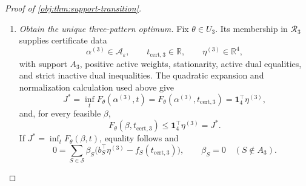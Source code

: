 \documentclass[11pt]{article}
\begin{document}
\begin{proof}[Proof of \cref{obj:thm:support-transition}]
\begin{enumerate}
For the five-pattern certificate, define
\[
I_5=I_\theta(\alpha^{(5)}),
\qquad
c=\begin{pmatrix}-1\\1\end{pmatrix},
\qquad
w_5=\frac{v(t_{\mathrm{cert},5})}{J^*(\theta,p,\varepsilon)}.
\]
The matrix \(I_5\) is positive semidefinite, since it is a sum of nonnegative multiples of \(g_Sg_S^\top\). Stationarity and the certificate value give
\[
\mathbf1_2^\top I_5v(t_{\mathrm{cert},5})=0,
\qquad
v(t_{\mathrm{cert},5})^\top I_5v(t_{\mathrm{cert},5})=J^*.
\]
The first identity makes the two coordinates of \(I_5v(t_{\mathrm{cert},5})\) opposite; the second makes its second coordinate \(J^*\). Hence
\[
I_5v(t_{\mathrm{cert},5})=J^*c,
\qquad
I_5w_5=c,
\qquad
c^\top w_5=\frac1{J^*}=V^*.
\]
Every other solution \(w_{\mathrm{alt}}\in\mathbb R^2\) of \(I_5w_{\mathrm{alt}}=c\) has the same contrast value, because
\[
c^\top(w_{\mathrm{alt}}-w_5)
=w_5^\top I_5(w_{\mathrm{alt}}-w_5)=0.
\]
The contrast-variance convention in \cref{obj:thm:five-output-region} therefore gives variance \(V^*>0\), equal to its nonnegative part.

For the associated staircase channel,
\[
(P_\theta Q_{\alpha^{(5)}})(\{S\})
=\alpha^{(5)}_S h_S(\theta).
\]
The positive masses \(h_S(\theta)\) make precisely the five patterns in \(A_5\) active, so
\[
\kappa(Q_{\alpha^{(5)}})=5.
\]
Feasibility supplies unit row sums, and the ray entries \(1,3\) supply the privacy inequalities. Finally, \cref{obj:thm:five-output-region} gives
\[
\kappa(Q)\ge5
\]
for every attaining stationary \(\varepsilon\)-LDP channel on any measurable output space, since \(\iota(\theta)\in\mathcal R_5\).

\item \emph{Obtain the unique three-pattern optimum.}
Fix \(\theta\in U_3\). Its membership in \(\mathcal R_3\) supplies certificate data
\[
\alpha^{(3)}\in\mathcal A_\varepsilon,\qquad
t_{\mathrm{cert},3}\in\mathbb R,\qquad
\eta^{(3)}\in\mathbb R^4,
\]
with support \(A_3\), positive active weights, stationarity, active dual equalities, and strict inactive dual inequalities. The quadratic expansion and normalization calculation used above give
\[
J^*
=\inf_tF_\theta(\alpha^{(3)},t)
=F_\theta(\alpha^{(3)},t_{\mathrm{cert},3})
=\mathbf1_4^\top\eta^{(3)},
\]
and, for every feasible \(\beta\),
\[
F_\theta(\beta,t_{\mathrm{cert},3})
\le\mathbf1_4^\top\eta^{(3)}=J^*.
\]
If \(J^*=\inf_tF_\theta(\beta,t)\), equality follows and
\[
0=\sum_{S\in\mathcal S}\beta_S
 \bigl(b_S^\top\eta^{(3)}-f_S(t_{\mathrm{cert},3})\bigr),
\qquad
\beta_S=0\quad(S\notin A_3).
\]


\end{enumerate}
\end{proof}
\end{document}
